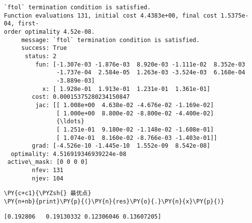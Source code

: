     \begin{Verbatim}[commandchars=\\\{\}]
`ftol` termination condition is satisfied.
Function evaluations 131, initial cost 4.4383e+00, final cost 1.5375e-04, first-
order optimality 4.52e-08.
     message: `ftol` termination condition is satisfied.
     success: True
      status: 2
         fun: [-1.307e-03 -1.876e-03  8.920e-03 -1.111e-02  8.352e-03
               -1.737e-04  2.584e-05  1.263e-03 -3.524e-03  6.168e-04
               -3.889e-03]
           x: [ 1.928e-01  1.913e-01  1.231e-01  1.361e-01]
        cost: 0.00015375280234150847
         jac: [[ 1.008e+00  4.638e-02 -4.676e-02 -1.169e-02]
               [ 1.000e+00  8.800e-02 -8.800e-02 -4.400e-02]
               {\ldots}
               [ 1.251e-01  9.180e-02 -1.148e-02 -1.608e-01]
               [ 1.074e-01  8.160e-02 -8.766e-03 -1.403e-01]]
        grad: [-4.526e-10 -1.445e-10  1.552e-09  8.542e-08]
  optimality: 4.516919346939224e-08
 active\_mask: [0 0 0 0]
        nfev: 131
        njev: 104
    \end{Verbatim}

    \begin{tcolorbox}[breakable, size=fbox, boxrule=1pt, pad at break*=1mm,colback=cellbackground, colframe=cellborder]
\begin{Verbatim}[commandchars=\\\{\}]
\PY{c+c1}{\PYZsh{} 最优点}
\PY{n+nb}{print}\PY{p}{(}\PY{n}{res}\PY{o}{.}\PY{n}{x}\PY{p}{)}
\end{Verbatim}
\end{tcolorbox}

    \begin{Verbatim}[commandchars=\\\{\}]
[0.192806   0.19130332 0.12306046 0.13607205]
    \end{Verbatim}
